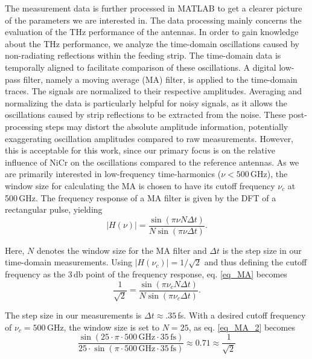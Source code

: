 The measurement data is further processed in MATLAB to get a clearer picture of the parameters we are interested in. The data processing mainly concerns the evaluation of the THz performance of the antennas. In order to gain knowledge about the THz performance, we analyze the time-domain oscillations caused by non-radiating reflections within the feeding strip. The time-domain data is temporally aligned to facilitate comparison of these oscillations. A digital low-pass filter, namely a moving average (MA) filter, is applied to the time-domain traces. The signals are normalized to their respective amplitudes. Averaging and normalizing the data is particularly helpful for noisy signals, as it allows the oscillations caused by strip reflections to be extracted from the noise. These post-processing steps may distort the absolute amplitude information, potentially exaggerating oscillation amplitudes compared to raw measurements. However, this is acceptable for this work, since our primary focus is on the relative influence of NiCr on the oscillations compared to the reference antennas. As we are primarily interested in low-frequency time-harmonics ($\nu < 500$\,\si{\giga \hertz}), the window size for calculating the MA is chosen to have its cutoff frequency $\nu_c$ at \num{500}\,\si{\giga \hertz}. The frequency response of a MA filter is given by the DFT of a rectangular pulse, yielding 
\begin{equation}
    |H(\nu)| = \frac{\sin (\pi \nu N \Delta t)}{N\sin (\pi \nu \Delta t)}.
    \label{eq_MA}
\end{equation}

Here, $N$ denotes the window size for the MA filter and $\Delta t$ is the step size in our time-domain measurements. Using $|H(\nu_c)| = 1/\sqrt{2}$ and thus defining the cutoff frequency as the \num{3}\,\si{\decibel} point of the frequency response, eq. \eqref{eq_MA} becomes
\begin{equation}
    \frac{1}{\sqrt{2}} = \frac{\sin (\pi \nu_c N \Delta t)}{N\sin (\pi \nu_c \Delta t)}. 
    \label{eq_MA_2}
\end{equation}

The step size in our measurements is $\Delta t \approx. 35$\,\si{\femto \s}. With a desired cutoff frequency of $\nu_c = 500$\,\si{\giga \hertz}, the window size is set to $N = 25$, as eq. \eqref{eq_MA_2} becomes 
\begin{equation}
    \frac{\sin (25 \cdot \pi \cdot 500\,\si{\giga \hertz} \cdot 35\,\si{\femto \s}) }{25 \cdot \sin (\pi \cdot 500\,\si{\giga \hertz} \cdot 35\,\si{\femto \s})} \approx 0.71 \approx \frac{1}{\sqrt{2}}
\end{equation}


